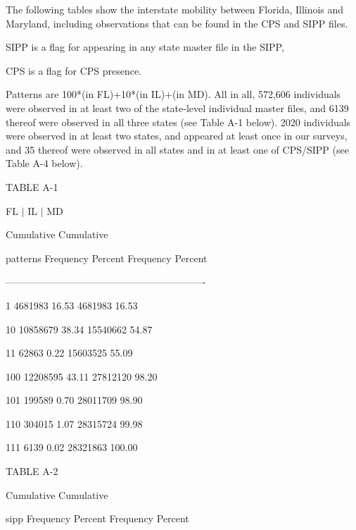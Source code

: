 %
%

The following tables show the interstate mobility between Florida, Illinois 
and Maryland, including observations that can be found in the CPS and SIPP 
files.

SIPP is a flag for appearing in any state master file in the SIPP, 

CPS is a flag for CPS presence.

Patterns are 100*(in FL)+10*(in IL)+(in MD). All in all, 572,606 individuals 
were observed in at least two of the state-level individual master files, 
and 6139 thereof were observed in all three states (see Table A-1 below). 
2020 individuals were observed in at least two states, and appeared at least 
once in our surveys, and 35 thereof were observed in all states and in at 
least one of CPS/SIPP (see Table A-4 below).

\textsf{TABLE A-1}





\textsf{FL $\vert $ IL $\vert $ MD}

\textsf{Cumulative Cumulative}

\textsf{patterns Frequency Percent Frequency Percent}

\textsf{-------------------------------------------------------------}

\textsf{1 4681983 16.53 4681983 16.53}

\textsf{10 10858679 38.34 15540662 54.87}

\textsf{11 62863 0.22 15603525 55.09}

\textsf{100 12208595 43.11 27812120 98.20}

\textsf{101 199589 0.70 28011709 98.90}

\textsf{110 304015 1.07 28315724 99.98}

\textsf{111 6139 0.02 28321863 100.00}





\textsf{TABLE A-2}





\textsf{Cumulative Cumulative}

\textsf{sipp Frequency Percent Frequency Percent}

